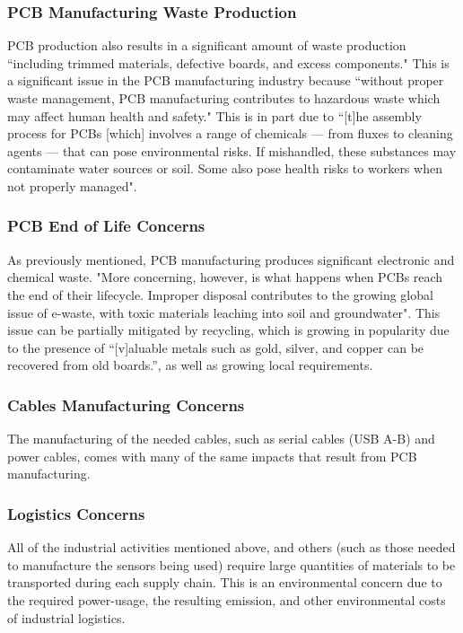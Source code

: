 \documentclass[../main.tex]{subfiles}
\begin{document}
\subsubsection{PCB Manufacturing Waste Production}
PCB production also results in a significant amount of waste production ``including trimmed materials, defective boards, and excess components."\cite{b1} This is a significant issue in the PCB manufacturing industry because ``without proper waste management, PCB manufacturing contributes to hazardous waste which may affect human health and safety."\cite{b2} This is in part due to ``[t]he assembly process for PCBs [which] involves a range of chemicals — from fluxes to cleaning agents — that can pose environmental risks. If mishandled, these substances may contaminate water sources or soil. Some also pose health risks to workers when not properly managed"\cite{b1}.

\subsubsection{PCB End of Life Concerns}
As previously mentioned, PCB manufacturing produces significant electronic and chemical waste. "More concerning, however, is what happens when PCBs reach the end of their lifecycle. Improper disposal contributes to the growing global issue of e-waste, with toxic materials leaching into soil and groundwater"\cite{b1}. This issue can be partially mitigated by recycling, which is growing in popularity due to the presence of ``[v]aluable metals such as gold, silver, and copper can be recovered from old boards.''\cite{b1}, as well as growing local requirements\cite{b1}.

\subsubsection{Cables Manufacturing Concerns}
The manufacturing of the needed cables, such as serial cables (USB A-B) and power cables, comes with many of the same impacts that result from PCB manufacturing\cite{b3}.

\subsubsection{Logistics Concerns}
All of the industrial activities mentioned above, and others (such as those needed to manufacture the sensors being used) require large quantities of materials to be transported during each supply chain. This is an environmental concern due to the required power-usage, the resulting emission, and other environmental costs of industrial logistics.
\end{document}
